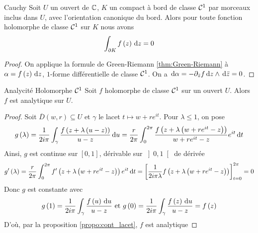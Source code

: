\documentclass{cours}
\begin{document}
\begin{théorème}{Cauchy}{}
    Soit $U$ un ouvert de $\mathbb{C}$, $K$ un compact à bord de classe $\mathcal{C}^{1}$ par morceaux inclus dans $U$, avec l'orientation canonique du bord. Alors pour toute fonction holomorphe de classe $\mathcal{C}^{1}$ sur $K$ nous avons 
    \begin{equation*}
        \int_{\partial K}f\left(z\right){\rm \, d} z = 0
    \end{equation*}
\end{théorème}
\begin{proof}
    On applique la formule de Green-Riemann \ref{thm:Green-Riemann} à $\alpha = f\left(z\right){\rm \, d} z$, $1$-forme différentielle de classe $\mathcal{C}^{1}$. On a ${\rm \, d} \alpha = -\partial_{\bar{z}}f{\rm \, d} z \land {\rm \, d} \bar{z} = 0$.
\end{proof}
\begin{corollaire}{Analycité Holomorphe $\mathcal{C}^{1}$}{}
    Soit $f$ holomorphe de classe $\mathcal{C}^{1}$ sur un ouvert $U$. Alors $f$ est analytique sur $U$. 
\end{corollaire}
\begin{proof}
    Soit $\overline{D}\left(w, r\right) \subseteq U$ et $\gamma$ le lacet $t \mapsto w + re^{it}$. Pour $\lambda \leq 1$, on pose
    \begin{equation*}
        g\left(\lambda\right) = \frac{1}{2i\pi}\int_{\gamma}\frac{f\left(z + \lambda\left(u - z\right)\right)}{u - z} {\rm \, d} u = \frac{r}{2\pi}\int_{0}^{2\pi}\frac{f\left(z +\lambda\left(w + re^{it} - z\right)\right)}{w + re^{it} - z}e^{it}{\rm \, d} t
    \end{equation*}
    Ainsi, $g$ est continue sur $\left[0, 1\right]$, dérivable sur $\left]0, 1\right[$ de dérivée 
    \begin{equation*}
        g'\left(\lambda\right) = \frac{r}{2\pi}\int_{0}^{2\pi}f'\left(z + \lambda\left(w + re^{it} - z\right)\right)e^{it}{\rm \, d} t = \left[\frac{1}{2i\pi\lambda}f\left(z + \lambda\left(w + re^{it} - z\right)\right)\right]_{t = 0}^{2\pi} = 0
    \end{equation*}
    Donc $g$ est constante avec 
    \begin{equation*}
        g\left(1\right) = \frac{1}{2i\pi}\int_{\gamma}^{}\frac{f\left(u\right){\rm \, d} u}{u - z} \text{ et } g\left(0\right) = \frac{1}{2i\pi}\int_{\gamma}\frac{f\left(z\right){\rm \, d} u}{u - z} = f\left(z\right)
    \end{equation*}
    D'où, par la proposition \ref{propo:cont_lacet}, $f$ est analytique 
\end{proof}
\end{document}
